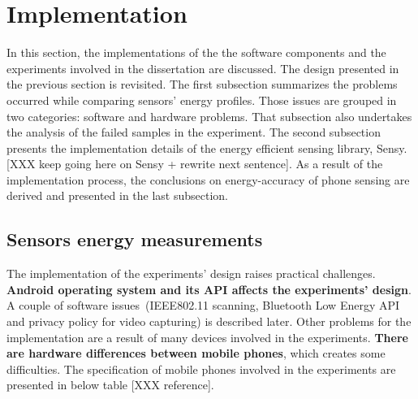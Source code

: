 \section{Implementation}
\label{s:implementation}
\hspace{10pt} In this section, the implementations of the the software components and the experiments involved in the dissertation are discussed. The design presented in the previous section is revisited. The first subsection summarizes the problems occurred while comparing sensors' energy profiles. Those issues are grouped in two categories: software and hardware problems. That subsection also undertakes the analysis of the failed samples in the experiment. The second subsection presents the implementation details of the energy efficient sensing library, Sensy. [XXX keep going here on Sensy + rewrite next sentence]. As a result of the implementation process, the conclusions on energy-accuracy of phone sensing are derived and presented in the last subsection.

\subsection{Sensors energy measurements}
The implementation of the experiments' design raises practical challenges. \textbf{Android operating system and its API affects the experiments' design}. A couple of software issues\ (IEEE802.11 scanning, Bluetooth Low Energy API and privacy policy for video capturing) is described later. Other problems for the implementation are a result of many devices involved in the experiments. \textbf{There are hardware differences between mobile phones},  which creates some difficulties. The specification of mobile phones involved in the experiments are presented in below table [XXX reference].
	
